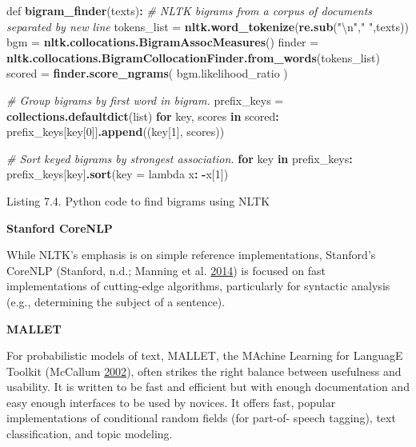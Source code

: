 \documentclass[]{krantz}
\newenvironment{Shaded}{\begin{snugshade}}{\end{snugshade}}
\newcommand{\KeywordTok}[1]{\textcolor[rgb]{0.13,0.29,0.53}{\textbf{#1}}}
\newcommand{\DataTypeTok}[1]{\textcolor[rgb]{0.13,0.29,0.53}{#1}}
\newcommand{\DecValTok}[1]{\textcolor[rgb]{0.00,0.00,0.81}{#1}}
\newcommand{\CharTok}[1]{\textcolor[rgb]{0.31,0.60,0.02}{#1}}
\newcommand{\StringTok}[1]{\textcolor[rgb]{0.31,0.60,0.02}{#1}}
\newcommand{\CommentTok}[1]{\textcolor[rgb]{0.56,0.35,0.01}{\textit{#1}}}
\newcommand{\ControlFlowTok}[1]{\textcolor[rgb]{0.13,0.29,0.53}{\textbf{#1}}}
\newcommand{\OperatorTok}[1]{\textcolor[rgb]{0.81,0.36,0.00}{\textbf{#1}}}
\newcommand{\NormalTok}[1]{#1}
\begin{document}
\begin{Shaded}
\begin{Highlighting}[]
\NormalTok{def }\KeywordTok{bigram_finder}\NormalTok{(texts)}\OperatorTok{:}
\StringTok{  }\CommentTok{# NLTK bigrams from a corpus of documents separated by new line}
\StringTok{  }\NormalTok{tokens_list =}\StringTok{ }\KeywordTok{nltk.word_tokenize}\NormalTok{(}\KeywordTok{re.sub}\NormalTok{(}\StringTok{"}\CharTok{\textbackslash{}n}\StringTok{"}\NormalTok{,}\StringTok{" "}\NormalTok{,texts))}
\NormalTok{  bgm    =}\StringTok{ }\KeywordTok{nltk.collocations.BigramAssocMeasures}\NormalTok{()}
\NormalTok{  finder =}\StringTok{ }\KeywordTok{nltk.collocations.BigramCollocationFinder.from_words}\NormalTok{(tokens_list)}
\NormalTok{  scored =}\StringTok{ }\KeywordTok{finder.score_ngrams}\NormalTok{( bgm.likelihood_ratio  )}

  \CommentTok{# Group bigrams by first word in bigram.}
\NormalTok{  prefix_keys =}\StringTok{ }\KeywordTok{collections.defaultdict}\NormalTok{(list)}
  \ControlFlowTok{for}\NormalTok{ key, scores }\ControlFlowTok{in}\NormalTok{ scored}\OperatorTok{:}
\StringTok{      }\NormalTok{prefix_keys[key[}\DecValTok{0}\NormalTok{]]}\KeywordTok{.append}\NormalTok{((key[}\DecValTok{1}\NormalTok{], scores))}

  \CommentTok{# Sort keyed bigrams by strongest association.}
  \ControlFlowTok{for}\NormalTok{ key }\ControlFlowTok{in}\NormalTok{ prefix_keys}\OperatorTok{:}
\StringTok{      }\NormalTok{prefix_keys[key]}\KeywordTok{.sort}\NormalTok{(}\DataTypeTok{key =}\NormalTok{ lambda x}\OperatorTok{:}\StringTok{ }\OperatorTok{-}\NormalTok{x[}\DecValTok{1}\NormalTok{])}
\end{Highlighting}
\end{Shaded}

Listing 7.4. Python code to find bigrams using NLTK

\textbf{Stanford CoreNLP}

While NLTK's emphasis is on simple reference implementations, Stanford's
CoreNLP (Stanford, n.d.; Manning et al.
\protect\hyperlink{ref-manning2014stanford}{2014}) is focused on fast
implementations of cutting-edge algorithms, particularly for syntactic
analysis (e.g., determining the subject of a sentence).

\textbf{MALLET}

For probabilistic models of text, MALLET, the MAchine Learning for
LanguagE Toolkit (McCallum \protect\hyperlink{ref-mallet}{2002}), often
strikes the right balance between usefulness and usability. It is
written to be fast and efficient but with enough documentation and easy
enough interfaces to be used by novices. It offers fast, popular
implementations of conditional random fields (for part-of- speech
tagging), text classification, and topic modeling.
\end{document}
